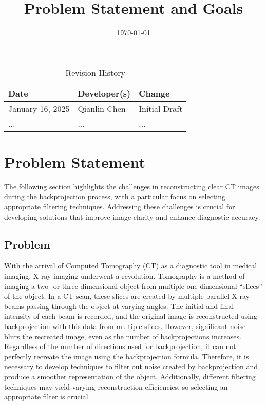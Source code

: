 \documentclass{article}
\title{Problem Statement and Goals\\\progname}
\author{\authname}
\date{\today}
\begin{document}
\maketitle

\begin{table}[hp]
\caption{Revision History} \label{TblRevisionHistory}
\begin{tabularx}{\textwidth}{llX}
\toprule
\textbf{Date} & \textbf{Developer(s)} & \textbf{Change}\\
\midrule
  January 16, 2025 & Qianlin Chen & Initial Draft \\
\midrule
  ... & ... & ...\\
\bottomrule
\end{tabularx}
\end{table}

\section{Problem Statement}
The following section highlights the challenges in reconstructing clear CT
images during the backprojection process, with a particular focus on selecting
appropriate filtering techniques. Addressing these challenges is crucial for
developing solutions that improve image clarity and enhance diagnostic accuracy.

\subsection{Problem}
With the arrival of Computed Tomography (CT) as a diagnostic tool in medical
imaging, X-ray imaging underwent a revolution. Tomography is a method of imaging
a two- or three-dimensional object from multiple one-dimensional ``slices'' of
the object. In a CT scan, these slices are created by multiple parallel X-ray
beams passing through the object at varying angles. The initial and final
intensity of each beam is recorded, and the original image is reconstructed
using backprojection with this data from multiple slices\cite{Beatty2012}.
\newline However, significant noise blurs the recreated image, even as the number of
backprojections increases. Regardless of the number of directions used for
backprojection, it can not perfectly recreate the image using the backprojection
formula\cite{Beatty2012}. Therefore, it is necessary to develop techniques to filter out noise
created by backprojection and produce a smoother representation of the object.
Additionally, different filtering techniques may yield varying reconstruction
efficiencies, so selecting an appropriate filter is crucial\cite{Lyra2011}.
\end{document}
